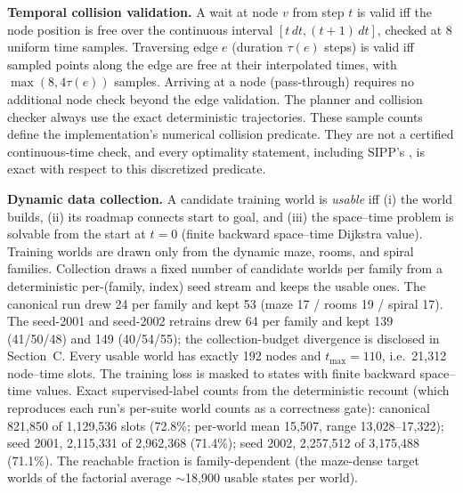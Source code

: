 \documentclass[letterpaper]{article} %
\begin{document}
\begin{table}[t]
\label{tab:archspec}
\end{table}

\textbf{Temporal collision validation.} A wait at node $v$ from step $t$ is valid iff the node position is free over the continuous interval $[t\,dt, (t{+}1)\,dt]$, checked at 8 uniform time samples. Traversing edge $e$ (duration $\tau(e)$ steps) is valid iff sampled points along the edge are free at their interpolated times, with $\max(8, 4\tau(e))$ samples. Arriving at a node (pass-through) requires no additional node check beyond the edge validation. The planner and collision checker always use the exact deterministic trajectories. These sample counts define the implementation's numerical collision predicate. They are not a certified continuous-time check, and every optimality statement, including SIPP's \citep{phillips2011sipp}, is exact with respect to this discretized predicate.

\textbf{Dynamic data collection.} A candidate training world is \emph{usable} iff (i) the world builds, (ii) its roadmap connects start to goal, and (iii) the space--time problem is solvable from the start at $t{=}0$ (finite backward space--time Dijkstra value). Training worlds are drawn only from the dynamic maze, rooms, and spiral families. Collection draws a fixed number of candidate worlds per family from a deterministic per-(family, index) seed stream and keeps the usable ones. The canonical run drew 24 per family and kept 53 (maze 17 / rooms 19 / spiral 17). The seed-2001 and seed-2002 retrains drew 64 per family and kept 139 (41/50/48) and 149 (40/54/55); the collection-budget divergence is disclosed in Section~C. Every usable world has exactly 192 nodes and $t_{\max}{=}110$, i.e.\ 21{,}312 node--time slots. The training loss is masked to states with finite backward space--time values. Exact supervised-label counts from the deterministic recount (which reproduces each run's per-suite world counts as a correctness gate): canonical 821{,}850 of 1{,}129{,}536 slots (72.8\%; per-world mean 15{,}507, range 13{,}028--17{,}322); seed 2001, 2{,}115{,}331 of 2{,}962{,}368 (71.4\%); seed 2002, 2{,}257{,}512 of 3{,}175{,}488 (71.1\%). The reachable fraction is family-dependent (the maze-dense target worlds of the factorial average $\sim$18{,}900 usable states per world).
\end{document}
